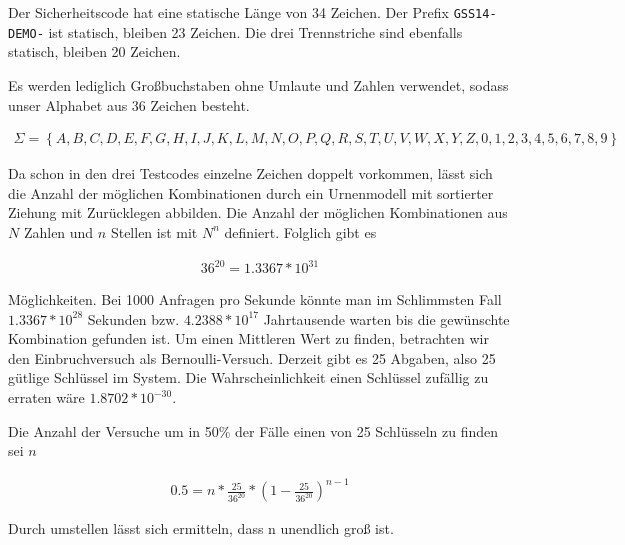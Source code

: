 \documentclass[ngerman]{fbi-aufgabenblatt}
\begin{document}
	Der Sicherheitscode hat eine statische Länge von 34 Zeichen. Der Prefix \texttt{GSS14-DEMO-} ist statisch, bleiben 23 Zeichen. Die drei Trennstriche sind ebenfalls statisch, bleiben 20 Zeichen. 

	Es werden lediglich Großbuchstaben ohne Umlaute und Zahlen verwendet, sodass unser Alphabet aus 36 Zeichen besteht.

	\begin{align*}
		\Sigma = \left\{A,B,C,D,E,F,G,H,I,J,K,L,M,N,O,P,Q,R,S,T,U,V,W,X,Y,Z,0,1,2,3,4,5,6,7,8,9\right\}
	\end{align*}

	Da schon in den drei Testcodes einzelne Zeichen doppelt vorkommen, lässt sich die Anzahl der möglichen Kombinationen durch ein Urnenmodell mit sortierter Ziehung mit Zurücklegen abbilden. Die Anzahl der möglichen Kombinationen aus $N$ Zahlen und $n$ Stellen ist mit $N^n$ definiert. Folglich gibt es

	\begin{align*}
		36^{20} = 1.3367*10^{31}
	\end{align*}

	Möglichkeiten. Bei 1000 Anfragen pro Sekunde könnte man im Schlimmsten Fall $1.3367*10^{28}$ Sekunden bzw. $4.2388*10^{17}$ Jahrtausende warten bis die gewünschte Kombination gefunden ist. Um einen Mittleren Wert zu finden, betrachten wir den Einbruchversuch als Bernoulli-Versuch. Derzeit gibt es 25 Abgaben, also 25 gütlige Schlüssel im System. Die Wahrscheinlichkeit einen Schlüssel zufällig zu erraten wäre $1.8702*10^{-30}$. 

	Die Anzahl der Versuche um in 50\% der Fälle einen von 25 Schlüsseln zu finden sei $n$

	\begin{align*}
		0.5 = n*\frac{25}{36^{20}}*(1-\frac{25}{36^{20}})^{n-1}
	\end{align*}

	Durch umstellen lässt sich ermitteln, dass n unendlich groß ist.
\end{document}
